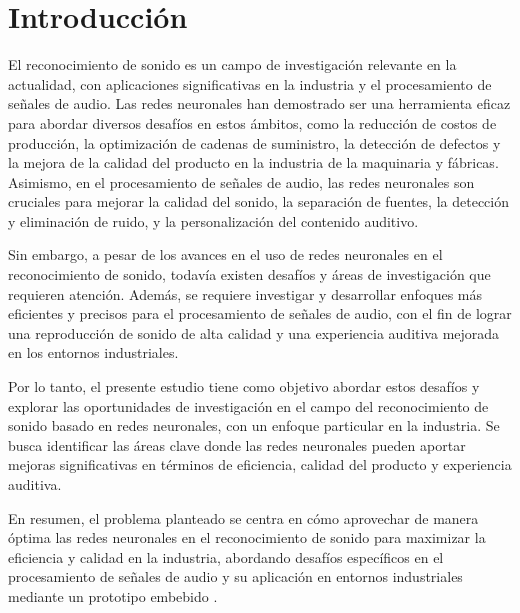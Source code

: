 
\newpage
\setcounter{secnumdepth}{0}
\section{Introducción}

El reconocimiento de sonido es un campo de investigación relevante en la actualidad, con aplicaciones significativas en la industria y el procesamiento de señales de audio. Las redes neuronales han demostrado ser una herramienta eficaz para abordar diversos desafíos en estos ámbitos, como la reducción de costos de producción, la optimización de cadenas de suministro, la detección de defectos y la mejora de la calidad del producto en la industria de la maquinaria y fábricas. Asimismo, en el procesamiento de señales de audio, las redes neuronales son cruciales para mejorar la calidad del sonido, la separación de fuentes, la detección y eliminación de ruido, y la personalización del contenido auditivo.

Sin embargo, a pesar de los avances en el uso de redes neuronales en el reconocimiento de sonido, todavía existen desafíos y áreas de investigación que requieren atención. Además, se requiere investigar y desarrollar enfoques más eficientes y precisos para el procesamiento de señales de audio, con el fin de lograr una reproducción de sonido de alta calidad y una experiencia auditiva mejorada en los entornos industriales.

Por lo tanto, el presente estudio tiene como objetivo abordar estos desafíos y explorar las oportunidades de investigación en el campo del reconocimiento de sonido basado en redes neuronales, con un enfoque particular en la industria. Se busca identificar las áreas clave donde las redes neuronales pueden aportar mejoras significativas en términos de eficiencia, calidad del producto y experiencia auditiva.

En resumen, el problema planteado se centra en cómo aprovechar de manera óptima las redes neuronales en el reconocimiento de sonido para maximizar la eficiencia y calidad en la industria, abordando desafíos específicos en el procesamiento de señales de audio y su aplicación en entornos industriales mediante un prototipo embebido \cite{agudoestudio, atriaredes, garciamendoza, gomezarmenta, openwebinars, seorl2014audiologia}.